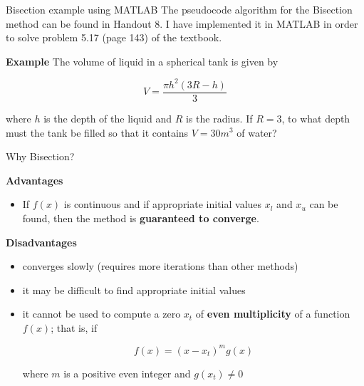 \documentclass[12pt]{beamer}
\begin{document}
\begin{frame}{Bisection example using MATLAB} 
The pseudocode algorithm for the Bisection method can be found in Handout 8. I have implemented it in MATLAB in order to 
solve problem 5.17 (page 143) of the textbook.

\vspace{\baselineskip}
{\bf Example}
The volume of liquid in a spherical tank is given by

\[
V = \frac{\pi h^2 (3R - h)}{3}
\]

where $h$ is the depth of the liquid and $R$ is the radius. If $R=3$, to what depth must the tank be filled so that it contains $V=30m^3$ of water?

\end{frame} 
\begin{frame}{Why Bisection?} 

{\bf Advantages}
\begin{itemize}
\item{If $f(x)$ is continuous and if appropriate initial values $x_l$ and $x_u$ can be found, then the method is {\bf guaranteed to converge}.}
\end{itemize}

{\bf Disadvantages}
\begin{itemize}
\item{converges slowly (requires more iterations than other methods)}
\item{it may be difficult to find appropriate initial values}
\item{it cannot be used to compute a zero $x_t$ of {\bf even multiplicity} of a function $f(x)$; that is, if}

\[
f(x)=(x-x_t)^mg(x)
\]

\noindent
where $m$ is a positive even integer and $g(x_t) \neq 0$


\end{itemize}

\end{frame} 
\end{document}
